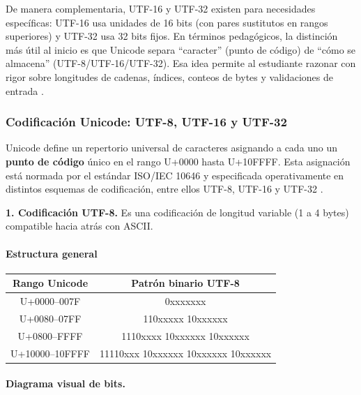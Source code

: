\documentclass[12pt,twoside]{book}
\begin{document}
					De manera complementaria, UTF-16 y UTF-32 existen para necesidades específicas: UTF-16 usa unidades de 16 bits (con pares sustitutos en rangos superiores) y UTF-32 usa 32 bits fijos. En términos pedagógicos, la distinción más útil al inicio es que Unicode separa ``caracter'' (punto de código) de ``cómo se almacena'' (UTF-8/UTF-16/UTF-32). Esa idea permite al estudiante razonar con rigor sobre longitudes de cadenas, índices, conteos de bytes y validaciones de entrada \cite{Unicode2025Standard,Hoffman2000UTF16}.
					
			\subsubsection{Codificación Unicode: UTF-8, UTF-16 y UTF-32}
				\noindent	
				Unicode define un repertorio universal de caracteres asignando a cada uno un \textbf{punto de código} único en el rango U+0000 hasta U+10FFFF. 
				Esta asignación está normada por el estándar ISO/IEC 10646 \cite{ISOIEC2020Information} y especificada operativamente en distintos esquemas de codificación, entre ellos UTF-8, UTF-16 y UTF-32 \cite{Yergeau2003UTF8,Unicode2025Standard}.
				
				\noindent
				\textbf{1. Codificación UTF-8.} Es una codificación de longitud variable (1 a 4 bytes) compatible hacia atrás con ASCII.
				
				\paragraph{Estructura general}
				
				\begin{center}
					\begin{tabular}{ c c }
						\hline
						Rango Unicode & Patrón binario UTF-8 \\
						\hline
						U+0000--007F & 0xxxxxxx \\
						U+0080--07FF & 110xxxxx 10xxxxxx \\
						U+0800--FFFF & 1110xxxx 10xxxxxx 10xxxxxx \\
						U+10000--10FFFF & 11110xxx 10xxxxxx 10xxxxxx 10xxxxxx \\
						\hline
					\end{tabular}
				\end{center}
				
				\paragraph{Diagrama visual de bits. }
				
\end{document}
